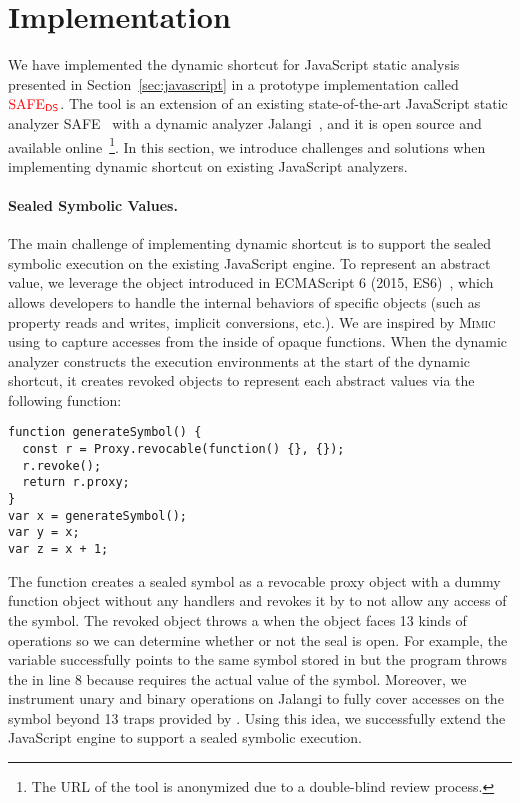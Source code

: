 \section{Implementation}\label{sec:implementation}

We have implemented the dynamic shortcut for JavaScript static analysis
presented in Section~\ref{sec:javascript} in a prototype implementation called
${\color{red}{\text{SAFE}_{\textsf{DS}}}}$.  The tool is an extension of an existing state-of-the-art JavaScript
static analyzer SAFE~\cite{safe, safe2} with a dynamic analyzer
Jalangi~\cite{jalangi}, and it is open source and available online~\footnote{The
URL of the tool is anonymized due to a double-blind review process.}.  In this
section, we introduce challenges and solutions when implementing dynamic
shortcut on existing JavaScript analyzers.


\paragraph{Sealed Symbolic Values.}
The main challenge of implementing dynamic shortcut is to support the sealed
symbolic execution on the existing JavaScript engine.  To represent an abstract
value, we leverage the  object introduced in ECMAScript 6
(2015, ES6)~\cite{es6}, which allows developers to handle the internal behaviors
of specific objects (such as property reads and writes, implicit conversions,
etc.).  We are inspired by \textsc{Mimic}~\cite{mimic} using  to
capture accesses from the inside of opaque functions.  When the dynamic analyzer
constructs the execution environments at the start of the dynamic shortcut, it
creates revoked  objects to represent each abstract values via the
following  function:
\begin{lstlisting}[style=myJSstyle]
function generateSymbol() {
  const r = Proxy.revocable(function() {}, {});
  r.revoke();
  return r.proxy;
}
var x = generateSymbol();
var y = x;
var z = x + 1;
\end{lstlisting}
The function creates a sealed symbol as a revocable proxy object with a dummy
function object without any handlers and revokes it by
 to not allow any access of the symbol.  The revoked
object throws a  when the object faces 13 kinds of operations
so we can determine whether or not the seal is open.  For example, the variable
 successfully points to the same symbol stored in  but the
program throws the  in line 8 because  requires
the actual value of the symbol.  Moreover, we instrument unary and binary
operations on Jalangi to fully cover accesses on the symbol beyond 13 traps
provided by .  Using this idea, we successfully extend the
JavaScript engine to support a sealed symbolic execution.


